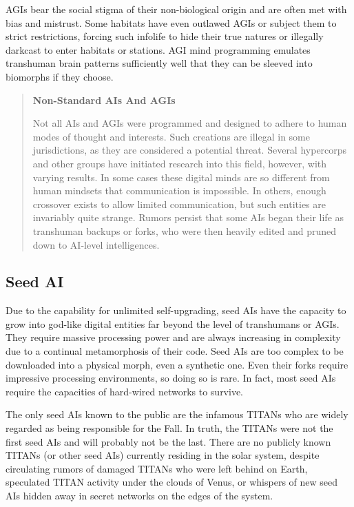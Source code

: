 AGIs bear the social stigma of their non-biological 
origin and are often met with bias and mistrust. Some 
habitats have even outlawed AGIs or subject them to 
strict restrictions, forcing such infolife to hide their 
true natures or illegally darkcast to enter habitats or 
stations. AGI mind programming emulates transhuman
brain patterns sufficiently well that they can be
sleeved into biomorphs if they choose.

\begin{quotation}
\textbf{Non-Standard AIs And AGIs}

Not all AIs and AGIs were programmed and designed
to adhere to human modes of thought
and interests. Such creations are illegal in some
jurisdictions, as they are considered a potential
threat. Several hypercorps and other groups
have initiated research into this field, however,
with varying results. In some cases these digital
minds are so different from human mindsets that
communication is impossible. In others, enough
crossover exists to allow limited communication,
but such entities are invariably quite strange.
Rumors persist that some AIs began their
life as transhuman backups or forks, who were
then heavily edited and pruned down to AI-level
intelligences.
\end{quotation}

\subsection{Seed AI}

Due to the capability for unlimited self-upgrading, 
seed AIs have the capacity to grow into god-like 
digital entities far beyond the level of transhumans 
or AGIs. They require massive processing power and 
are always increasing in complexity due to a continual 
metamorphosis of their code. Seed AIs are too complex
to be downloaded into a physical morph, even
a synthetic one. Even their forks require impressive 
processing environments, so doing so is rare. In fact, 
most seed AIs require the capacities of hard-wired 
networks to survive.

The only seed AIs known to the public are the 
infamous TITANs who are widely regarded as being 
responsible for the Fall. In truth, the TITANs were 
not the first seed AIs and will probably not be the last. 
There are no publicly known TITANs (or other seed 
AIs) currently residing in the solar system, despite 
circulating rumors of damaged TITANs who were left 
behind on Earth, speculated TITAN activity under the 
clouds of Venus, or whispers of new seed AIs hidden 
away in secret networks on the edges of the system.

